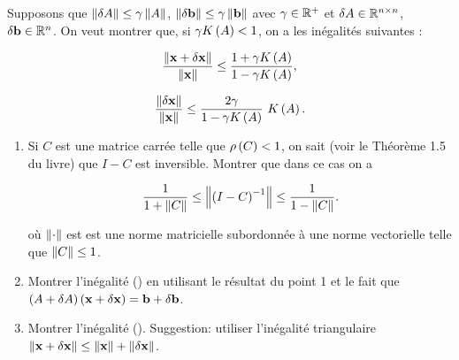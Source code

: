Supposons que $\left\lVert\delta A\right\rVert \leq \gamma \left\lVert A\right\rVert$, $\left\lVert\delta \mathbf{b}\right\rVert \leq \gamma \left\lVert\mathbf{b}\right\rVert$ avec $\gamma \in \mathbb{R}^{+}$ et $\delta A \in \mathbb{R}^{n \times n}$, $\delta \mathbf{b} \in \mathbb{R}^{n}$.
On veut montrer que, si $\gamma K \left(A\right) < 1$, on a les inégalités suivantes :

\begin{equation}
\label{eq:xPlusDelta}
  \dfrac{\left\lVert\mathbf{x} + \delta \mathbf{x}\right\rVert}{\left\lVert\mathbf{x}\right\rVert}
  \leq \dfrac{1 + \gamma K \left(A\right)}{1 - \gamma K \left(A\right)},
\end{equation}

\begin{equation}
\label{eq:xDelta}
  \dfrac{\left\lVert\delta \mathbf{x}\right\rVert}{\left\lVert\mathbf{x}\right\rVert}
  \leq \dfrac{2 \gamma}{1 - \gamma K \left(A\right)} \ K \left(A\right).
\end{equation}

\begin{enumerate}[label=\alph*)]
  \item Si $C$ est une matrice carrée telle que $\rho \left(C\right) < 1$, on sait (voir le Théorème 1.5 du livre) que $I - C$ est inversible.
        Montrer que dans ce cas on a
        
        \begin{equation}
        \label{eq:normC}
          \dfrac{1}{1 + \left\lVert C\right\rVert}
          \leq \left\lVert\left(I - C\right)^{-1}\right\rVert
          \leq \dfrac{1}{1 - \left\lVert C\right\rVert}.
        \end{equation}
        
        où $\left\lVert\cdot\right\rVert$ est est une norme matricielle subordonnée à une norme vectorielle telle que $\left\lVert C\right\rVert \leq 1$. 
        
        \item Montrer l'inégalité () en utilisant le résultat du point 1 et le fait que $\left(A + \delta A\right) \left(\mathbf{x} + \delta \mathbf{x}\right) = \mathbf{b} + \delta \mathbf{b}$.
        
        \item Montrer l'inégalité (). Suggestion: utiliser l'inégalité triangulaire $\left\lVert\mathbf{x} + \delta \mathbf{x}\right\rVert \leq \left\lVert\mathbf{x}\right\rVert + \left\lVert\delta \mathbf{x}\right\rVert$.

\end{enumerate}


